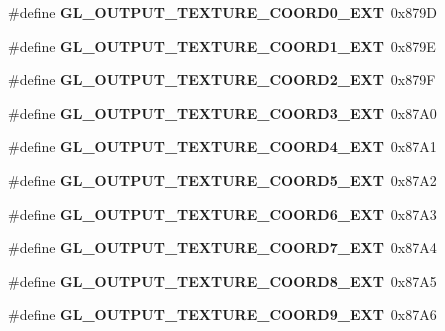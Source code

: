 \begin{DoxyCompactItemize}
\item 
\#define {\bfseries G\+L\+\_\+\+O\+U\+T\+P\+U\+T\+\_\+\+T\+E\+X\+T\+U\+R\+E\+\_\+\+C\+O\+O\+R\+D0\+\_\+\+E\+X\+T}~0x879\+D\label{_s_d_l__opengl_8h_afb64e940c7403cd8266247db502717c1}

\item 
\#define {\bfseries G\+L\+\_\+\+O\+U\+T\+P\+U\+T\+\_\+\+T\+E\+X\+T\+U\+R\+E\+\_\+\+C\+O\+O\+R\+D1\+\_\+\+E\+X\+T}~0x879\+E\label{_s_d_l__opengl_8h_a1ee0e56aa24f1d3455e32e7b6801640f}

\item 
\#define {\bfseries G\+L\+\_\+\+O\+U\+T\+P\+U\+T\+\_\+\+T\+E\+X\+T\+U\+R\+E\+\_\+\+C\+O\+O\+R\+D2\+\_\+\+E\+X\+T}~0x879\+F\label{_s_d_l__opengl_8h_aca722c2681d07989003c35a29a8784f0}

\item 
\#define {\bfseries G\+L\+\_\+\+O\+U\+T\+P\+U\+T\+\_\+\+T\+E\+X\+T\+U\+R\+E\+\_\+\+C\+O\+O\+R\+D3\+\_\+\+E\+X\+T}~0x87\+A0\label{_s_d_l__opengl_8h_a4d741592af67e36886a69ee989709010}

\item 
\#define {\bfseries G\+L\+\_\+\+O\+U\+T\+P\+U\+T\+\_\+\+T\+E\+X\+T\+U\+R\+E\+\_\+\+C\+O\+O\+R\+D4\+\_\+\+E\+X\+T}~0x87\+A1\label{_s_d_l__opengl_8h_ab82698a3080aba91c0b08a7091583a84}

\item 
\#define {\bfseries G\+L\+\_\+\+O\+U\+T\+P\+U\+T\+\_\+\+T\+E\+X\+T\+U\+R\+E\+\_\+\+C\+O\+O\+R\+D5\+\_\+\+E\+X\+T}~0x87\+A2\label{_s_d_l__opengl_8h_a840894cc4babb4c49be6c376b253c8e6}

\item 
\#define {\bfseries G\+L\+\_\+\+O\+U\+T\+P\+U\+T\+\_\+\+T\+E\+X\+T\+U\+R\+E\+\_\+\+C\+O\+O\+R\+D6\+\_\+\+E\+X\+T}~0x87\+A3\label{_s_d_l__opengl_8h_a1445ff36b3f79a6c2e849f4c3caffbf6}

\item 
\#define {\bfseries G\+L\+\_\+\+O\+U\+T\+P\+U\+T\+\_\+\+T\+E\+X\+T\+U\+R\+E\+\_\+\+C\+O\+O\+R\+D7\+\_\+\+E\+X\+T}~0x87\+A4\label{_s_d_l__opengl_8h_a6cb2b4ec77526e7b1a7de99aa10e38d0}

\item 
\#define {\bfseries G\+L\+\_\+\+O\+U\+T\+P\+U\+T\+\_\+\+T\+E\+X\+T\+U\+R\+E\+\_\+\+C\+O\+O\+R\+D8\+\_\+\+E\+X\+T}~0x87\+A5\label{_s_d_l__opengl_8h_af220386f6564fe0f09d1f8d311519b12}

\item 
\#define {\bfseries G\+L\+\_\+\+O\+U\+T\+P\+U\+T\+\_\+\+T\+E\+X\+T\+U\+R\+E\+\_\+\+C\+O\+O\+R\+D9\+\_\+\+E\+X\+T}~0x87\+A6\label{_s_d_l__opengl_8h_a4ceadbb40b56dacd4c09d247622d9dc2}


\end{DoxyCompactItemize}
